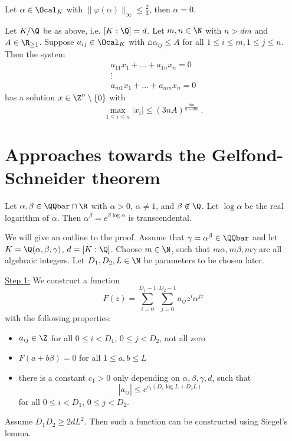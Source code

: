 \begin{lem}
	Let \( \alpha \in \Ocal_K \) with \( \|\varphi(\alpha)\|_\infty \leq \frac{2}{3} \), then \( \alpha = 0 \).
\end{lem}

\begin{thm}
	Let \( K / \Q \) be as above, i.e. \( [K:\Q] = d \).
	Let \( m, n \in \N \) with \( n > dm \) and \( A \in \R_{\geq 1} \).
	Suppose \( a_{ij} \in \Ocal_K \) with \( \house{\alpha_{ij}} \leq A \) for all \( 1 \leq i \leq m, 1 \leq j \leq n \).
	Then the system
	\begin{equation*}
		\begin{array}{c}
			a_{11} x_1 + \dots + a_{1n} x_n = 0\\
			\vdots \\
			a_{m1} x_1 + \dots + a_{mn} x_n = 0
		\end{array}
	\end{equation*}
	has a solution \( x \in \Z^n \setminus \{0\} \) with
	\[ \max_{1 \leq i \leq n} |x_i| \leq (3nA)^\frac{dm}{n-dm} \,. \]
\end{thm}


\section{Approaches towards the Gelfond-Schneider theorem}

\begin{thm}
	Let \( \alpha,\beta \in \QQbar \cap \R \) with \( \alpha>0 \), \( \alpha \neq 1 \), and \( \beta \not\in \Q \).
	Let \( \log\alpha \) be the real logarithm of \( \alpha \).
	Then \( \alpha^\beta = e^{\beta \log\alpha} \) is transcendental.
\end{thm}

We will give an outline to the proof.
Assume that \( \gamma = \alpha^\beta \in \QQbar \) and let \( K = \Q(\alpha, \beta, \gamma) \), \( d = [K:\Q] \).
Choose \( m \in \N \), such that \( m\alpha, m\beta, m\gamma \) are all algebraic integers.
Let \( D_1, D_2, L \in \N \) be parameters to be chosen later.

\underline{Step 1:} We construct a function
\[ F(z) = \sum_{i=0}^{D_1-1} \sum_{j=0}^{D_2 - 1} a_{ij}z^i \alpha^{jz} \]
with the following properties:
\begin{itemize}
	\item \( a_{ij} \in \Z \) for all \( 0 \leq i < D_1 \), \( 0 \leq j < D_2 \), not all zero
	\item \( F(a+b\beta) = 0 \) for all \( 1 \leq a, b \leq L \)
	\item there is a constant \( c_1 > 0 \) only depending on \( \alpha, \beta, \gamma, d \), such that
		\[ |a_{ij}| \leq e^{c_1 (D_1 \log L + D_2 L)} \]
		for all \( 0 \leq i < D_1 \), \( 0 \leq j < D_2 \).
\end{itemize}
Assume \( D_1D_2 \geq 2dL^2 \).
Then such a function can be constructed using Siegel's lemma.

